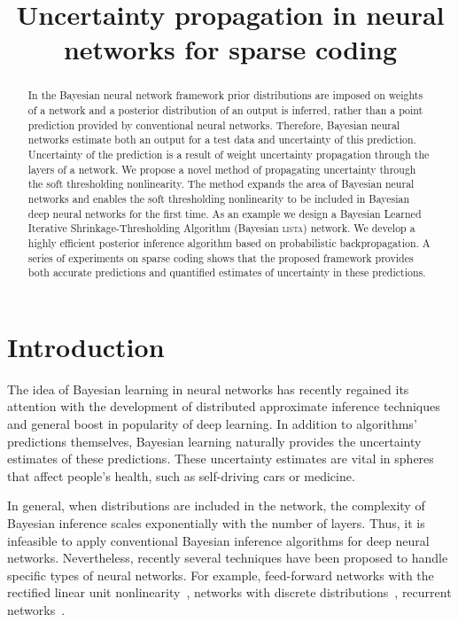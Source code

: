 \documentclass{article}
\title{Uncertainty propagation in neural networks for sparse coding}
\author{} %
\begin{document}
\maketitle

\begin{abstract}
In the Bayesian neural network framework prior distributions are imposed on weights of a network and a posterior distribution of an output is inferred, rather than a point prediction provided by conventional neural networks. Therefore, Bayesian neural networks estimate both an output for a test data and uncertainty of this prediction. Uncertainty of the prediction is a result of weight uncertainty propagation through the layers of a network. We propose a novel method of propagating uncertainty through the soft thresholding nonlinearity. The method expands the area of Bayesian neural networks and enables the soft thresholding nonlinearity to be included in Bayesian deep neural networks for the first time. As an example we design a Bayesian Learned Iterative Shrinkage-Thresholding Algorithm (Bayesian \textsc{lista}) network. We develop a highly efficient posterior inference algorithm based on probabilistic backpropagation. A series of experiments on sparse coding shows that the proposed framework provides both accurate predictions and quantified estimates of uncertainty in these predictions.
\end{abstract}

\section{Introduction}
The idea of Bayesian learning in neural networks \citep{neal2012bayesian} has recently regained its attention with the development of distributed approximate inference techniques \citep{li2015stochastic, hoffman2013stochastic} and general boost in popularity of deep learning. In addition to algorithms' predictions themselves, Bayesian learning naturally provides the uncertainty estimates of these predictions. These uncertainty estimates are vital in spheres that affect people's health, such as self-driving cars or medicine.

In general, when distributions are included in the network, the complexity of Bayesian inference scales exponentially with the number of layers. Thus, it is infeasible to apply conventional Bayesian inference algorithms for deep neural networks. Nevertheless, recently several techniques have been proposed to handle specific types of neural networks. For example, feed-forward networks with the rectified linear unit nonlinearity~\citep{hernandez2015probabilistic}, networks with discrete distributions~\citep{soudry2014expectation}, recurrent networks~\citep{mcdermott2017bayesian}.
\end{document}
